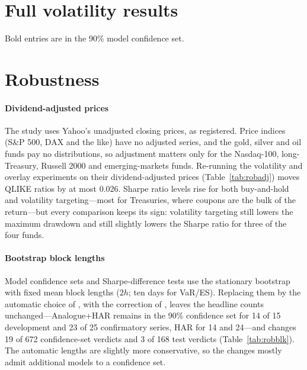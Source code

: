 \appendix
\section{Full volatility results}
\label{app:vol}
Bold entries are in the 90\% model confidence set.
\begin{center}\resizebox{0.9\linewidth}{!}{}\end{center}

\section{Robustness}
\label{app:rob}

\paragraph{Dividend-adjusted prices} The study uses Yahoo's unadjusted closing prices, as
registered. Price indices (S\&P 500, DAX and the like) have no adjusted series, and the gold,
silver and oil funds pay no distributions, so adjustment matters only for the Nasdaq-100,
long-Treasury, Russell 2000 and emerging-markets funds. Re-running the volatility and overlay
experiments on their dividend-adjusted prices (Table~\ref{tab:robadj}) moves QLIKE ratios by at
most 0.026. Sharpe ratio levels rise for both buy-and-hold and volatility targeting---most for
Treasuries, where coupons are the bulk of the return---but every comparison keeps its sign:
volatility targeting still lowers the maximum drawdown and still slightly lowers the Sharpe ratio
for three of the four funds.

\begin{table}[h]
\centering\scriptsize
\caption{Unadjusted versus dividend-adjusted prices (volatility: $h=5$ and $h=22$; overlay: $h=5$).}
\label{tab:robadj}
\resizebox{\linewidth}{!}{}
\end{table}

\paragraph{Bootstrap block lengths} Model confidence sets and Sharpe-difference tests use the
stationary bootstrap with fixed mean block lengths ($2h$; ten days for VaR/ES). Replacing them by
the automatic choice of \citet{politis2004}, with the correction of \citet{patton2009}, leaves the
headline counts unchanged---Analogue+HAR remains in the 90\% confidence set for 14 of 15
development and 23 of 25 confirmatory series, HAR for 14 and 24---and changes 19 of 672
confidence-set verdicts and 3 of 168 test verdicts (Table~\ref{tab:robblk}). The automatic lengths
are slightly more conservative, so the changes mostly admit additional models to a confidence set.

